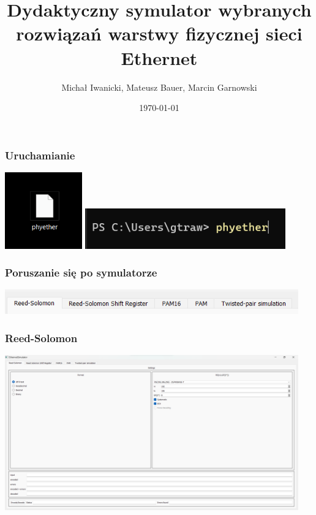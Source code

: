 \documentclass{beamer}
\title[Symulator phyether]{\textbf{Dydaktyczny symulator wybranych rozwiązań warstwy fizycznej sieci Ethernet}}
\author[Iwanicki M., Bauer M., Garnowski M.]{Michał Iwanicki, Mateusz Bauer, Marcin Garnowski}
\institute[PG]{Politechnika Gdańska}
\date{\today}
\begin{document}
\frame{\titlepage}

\begin{frame}
    \frametitle{Uruchamianie}
    \includegraphics[width=0.25\textwidth]{prezentacja_start1.png}
    \hfill
    \includegraphics[width=0.65\textwidth]{prezentacja_start2.png}
\end{frame}

\begin{frame}
    \frametitle{Poruszanie się po symulatorze}
    \begin{center}
        \includegraphics[width=0.95\textwidth]{zakladki.png}
    \end{center}
\end{frame}

\begin{frame}
    \frametitle{Reed-Solomon}
    \begin{center}
        \includegraphics[width=0.95\textwidth,height=0.85\textheight,keepaspectratio]{prezentacja_rs.png}
    \end{center}
\end{frame}
\end{document}
